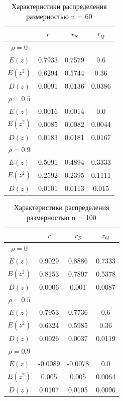 \documentclass[12pt,a4paper]{article}
\begin{document}
\begin{table}[H]
    \centering
    \begin{tabular}{|c|c|c|c|}
        \hline
        & $r$ & $r_S$ & $r_Q$\\\hline
        $\rho=0$ & & &\\\hline
        $E(z)$ & 0.7933 & 0.7579 & 0.6\\\hline
        $E(z^2)$ & 0.6294 & 0.5744 & 0.36\\\hline
        $D(z)$ & 0.0091 & 0.0136 & 0.0386\\\hline
        \hline
        $\rho=0.5$ & & &\\\hline
        $E(z)$ & 0.0016 & 0.0014 & 0.0\\\hline
        $E(z^2)$ & 0.0085 & 0.0082 & 0.0044\\\hline
        $D(z)$ & 0.0183 & 0.0181 & 0.0167\\\hline
        \hline
        $\rho=0.9$ & & &\\\hline
        $E(z)$ & 0.5091 & 0.4894 & 0.3333\\\hline
        $E(z^2)$ & 0.2592 & 0.2395 & 0.1111\\\hline
        $D(z)$ & 0.0101 & 0.0113 & 0.015\\\hline
    \end{tabular}
    \caption{Характеристики распределения размерностью n = 60}
\end{table}

\begin{table}[H]
    \centering
    \begin{tabular}{|c|c|c|c|}
        \hline
        & $r$ & $r_S$ & $r_Q$\\\hline
        $\rho=0$ & & &\\\hline
        $E(z)$ & 0.9029 & 0.8886 & 0.7333\\\hline
        $E(z^2)$ & 0.8153 & 0.7897 & 0.5378\\\hline
        $D(z)$ & 0.0006 & 0.001 & 0.0087\\\hline
        \hline
        $\rho=0.5$ & & &\\\hline
        $E(z)$ & 0.7953 & 0.7736 & 0.6\\\hline
        $E(z^2)$ & 0.6324 & 0.5985 & 0.36\\\hline
        $D(z)$ & 0.0026 & 0.0037 & 0.0119\\\hline
        \hline
        $\rho=0.9$ & & &\\\hline
        $E(z)$ & -0.0089 & -0.0078 & 0.0\\\hline
        $E(z^2)$ & 0.005 & 0.005 & 0.0064\\\hline
        $D(z)$ & 0.0107 & 0.0105 & 0.0096\\\hline
    \end{tabular}
    \caption{Характеристики распределения размерностью n = 100}
\end{table}
\end{document}
